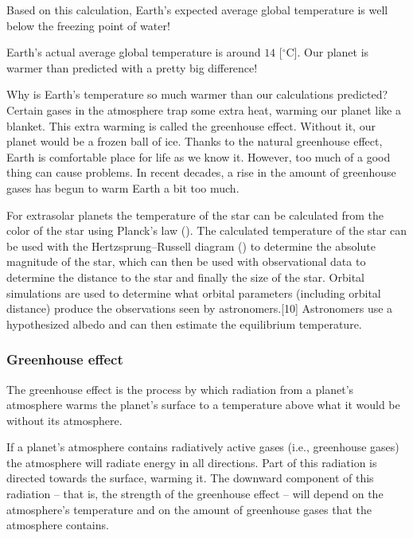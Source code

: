 	Based on this calculation, Earth's expected average global temperature is well below the freezing point of water!

	Earth's actual average global temperature is around $14$ [$^\circ$C]. Our planet is warmer than predicted with  a pretty big difference!

	Why is Earth's temperature so much warmer than our calculations predicted? Certain gases in the atmosphere trap some extra heat, warming our planet like a blanket. This extra warming is called the greenhouse effect. Without it, our planet would be a frozen ball of ice. Thanks to the natural greenhouse effect, Earth is comfortable place for life as we know it. However, too much of a good thing can cause problems. In recent decades, a rise in the amount of greenhouse gases has begun to warm Earth a bit too much.
	
	\begin{tcolorbox}[title=Remark,colframe=black,arc=10pt]
	For extrasolar planets the temperature of the star can be calculated from the color of the star using Planck's law (). The calculated temperature of the star can be used with the Hertzsprung–Russell diagram () to determine the absolute magnitude of the star, which can then be used with observational data to determine the distance to the star and finally the size of the star. Orbital simulations are used to determine what orbital parameters (including orbital distance) produce the observations seen by astronomers.[10] Astronomers use a hypothesized albedo and can then estimate the equilibrium temperature.
	\end{tcolorbox}
	
	\pagebreak
	\subsubsection{Greenhouse effect}
	The greenhouse effect is the process by which radiation from a planet's atmosphere warms the planet's surface to a temperature above what it would be without its atmosphere.

	If a planet's atmosphere contains radiatively active gases (i.e., greenhouse gases) the atmosphere will radiate energy in all directions. Part of this radiation is directed towards the surface, warming it. The downward component of this radiation – that is, the strength of the greenhouse effect – will depend on the atmosphere's temperature and on the amount of greenhouse gases that the atmosphere contains.

